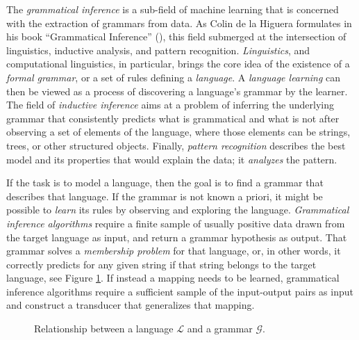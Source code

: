 The \emph{grammatical inference} is a sub-field of machine learning 
that is concerned with the extraction of grammars from data.
As Colin de la Higuera formulates in his book ``Grammatical Inference'' (\citeyear{DeLaHiguera2010}), this field submerged at the intersection of linguistics, inductive analysis, and pattern recognition.
\emph{Linguistics}, and computational linguistics, in particular, brings the core idea of the existence of a \emph{formal grammar}, or a set of rules defining a \emph{language}.
A \emph{language learning} can then be viewed as a process of discovering a language's grammar by the learner.
The field of \emph{inductive inference} aims at a problem of inferring the underlying grammar that consistently predicts what is grammatical and what is not after observing a set of elements of the language, where those elements can be strings, trees, or other structured objects.
Finally, \emph{pattern recognition} describes the best model and its properties that would explain the data; it \emph{analyzes} the pattern.

If the task is to model a language, then the goal is to find a grammar that describes that language.
If the grammar is not known a priori, it might be possible to \emph{learn} its rules by observing and exploring the language.
\emph{Grammatical inference algorithms} require a finite sample of usually positive data drawn from the target language as input, and return a grammar hypothesis as output.
That grammar solves a \emph{membership problem} for that language, or, in other words, it correctly predicts for any given string if that string belongs to the target language, see Figure \ref{fig:LGrel}.
If instead a mapping needs to be learned, grammatical inference algorithms require a sufficient sample of the input-output pairs as input and construct a transducer that generalizes that mapping.

\begin{figure}[t]
  \centering
  \caption{Relationship between a language $\mathcal{L}$ and a grammar $\mathcal{G}$.}
  \label{fig:LGrel}
\end{figure}


